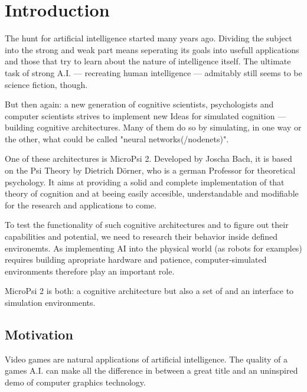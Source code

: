 \chapter{Introduction}
The hunt for artificial intelligence started many years ago. Dividing the subject into the strong and weak part means seperating its goals into usefull applications and those that try to learn about the nature of intelligence itself. The ultimate task of strong A.I. --- recreating human intelligence --- admitably still seems to be science fiction, though.

But then again: a new generation of cognitive scientists, psychologists and computer scientists strives to implement new Ideas for simulated cognition --- building cognitive architectures. Many of them do so by simulating, in one way or the other, what could be called "neural networks(/nodenets)".

One of these architectures is MicroPsi 2. Developed by Joscha Bach, it is based on the Psi Theory by Dietrich Dörner, who is a german Professor for theoretical psychology. It aims at providing a solid and complete implementation of that theory of cognition and at beeing easily accesible, understandable and modifiable for the research and applications to come.

To test the functionality of such cognitive architectures and to figure out their capabilities and potential, we need to research their behavior inside defined environemts. As implementing AI into the physical world (as robots for examples) requires building apropriate hardware and patience, computer-simulated environments therefore play an important role.

MicroPsi 2 is both: a cognitive architecture but also a set of and an interface to simulation environments.

\section{Motivation}
Video games are natural applications of artificial intelligence. The quality of a games A.I. can make all the difference in between a great title and an uninspired demo of computer graphics technology.

